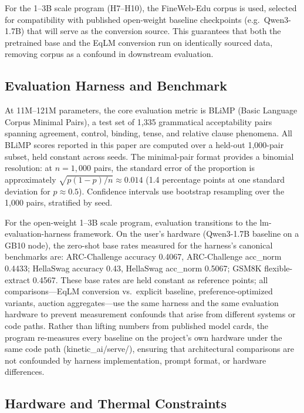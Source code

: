 For the 1–3B scale program (H7–H10), the FineWeb-Edu corpus is used, selected for compatibility with published
open-weight baseline checkpoints (e.g.\ Qwen3-1.7B) that will serve as the conversion source. This guarantees
that both the pretrained base and the EqLM conversion run on identically sourced data, removing corpus as a
confound in downstream evaluation.

\subsection{Evaluation Harness and Benchmark}

At 11M–121M parameters, the core evaluation metric is BLiMP (Basic Language Corpus Minimal Pairs), a test set of
1,335 grammatical acceptability pairs spanning agreement, control, binding, tense, and relative clause phenomena.
All BLiMP scores reported in this paper are computed over a held-out 1,000-pair subset, held constant across seeds.
The minimal-pair format provides a binomial resolution: at $n = 1{,}000$ pairs, the standard error of the proportion
is approximately $\sqrt{p(1-p)/n} \approx 0.014$ (1.4 percentage points at one standard deviation for $p \approx 0.5$).
Confidence intervals use bootstrap resampling over the 1,000 pairs, stratified by seed.

For the open-weight 1–3B scale program, evaluation transitions to the lm-evaluation-harness framework. On the
user's hardware (Qwen3-1.7B baseline on a GB10 node), the zero-shot base rates measured for the harness's canonical
benchmarks are: ARC-Challenge accuracy 0.4067, ARC-Challenge acc\_norm 0.4433; HellaSwag accuracy 0.43, HellaSwag
acc\_norm 0.5067; GSM8K flexible-extract 0.4567. These base rates are held constant as reference points; all
comparisons—EqLM conversion vs.\ explicit baseline, preference-optimized variants, auction aggregates—use the same
harness and the same evaluation hardware to prevent measurement confounds that arise from different systems or code
paths. Rather than lifting numbers from published model cards, the program re-measures every baseline on the project's
own hardware under the same code path (kinetic\_ai/serve/), ensuring that architectural comparisons are not confounded
by harness implementation, prompt format, or hardware differences.

\subsection{Hardware and Thermal Constraints}

